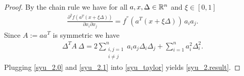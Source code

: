 \begin{proof}
  By the chain rule 
  we have
  for all $a, x, \Delta \in \mathbb{R}^n$ and $\xi \in [0,1]$
  \begin{gather}
    \label{syu_2.0}
    \frac{\partial^2  f(a^T (x + \xi \Delta)) }{\partial x_i \partial x_j}
    =
    f^{''}(a^T (x + \xi \Delta))\, a_i a_j
    .
  \end{gather}
  Since 
  $A:= a a^T$ is symmetric
  we have
  \begin{gather}
    \label{syu_2.1}
    \Delta^T A\ \Delta 
    =
    2
    \sum_{
    \begin{smallmatrix}
      i,j = 1 \\ 
      i \neq j
    \end{smallmatrix}
    }
    ^{n}
    a_i a_j \Delta_i \Delta_j
    + 
    \sum_{i=1}^{n} 
    a_i^2 \Delta_i^2.
  \end{gather}
  Plugging \eqref{syu_2.0} and \eqref{syu_2.1} into \eqref{syu_taylor}
  yields
  \eqref{syu_2.result}.
\end{proof}

